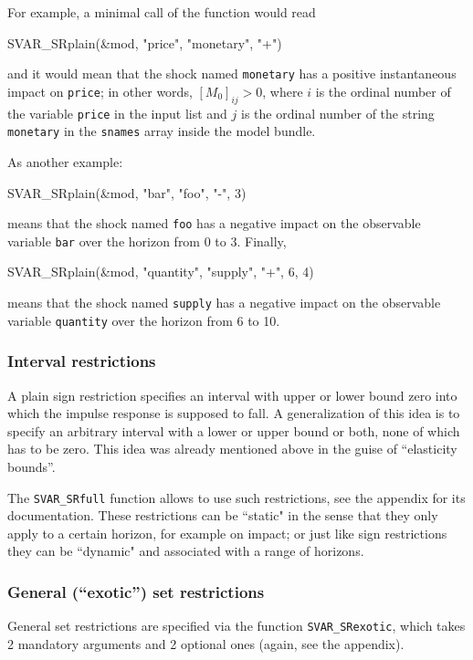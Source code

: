\documentclass[a4paper,10pt]{article}
\begin{document}
For example, a minimal call of the function would read
\begin{code}
  SVAR_SRplain(&mod, "price", "monetary", "+")
\end{code}
and it would mean that the shock named \texttt{monetary} has a
positive instantaneous impact on \texttt{price}; in other words,
$[M_0]_{ij} > 0$, where $i$ is the ordinal number of the variable
\texttt{price} in the input list and $j$ is the ordinal number of the
string \texttt{monetary} in the \texttt{snames} array inside the model
bundle.

As another example:
\begin{code}
SVAR_SRplain(&mod, "bar", "foo", "-", 3)
\end{code}
means that the shock named \texttt{foo} has a negative impact on the
observable variable \texttt{bar} over the horizon from 0 to
3. Finally,
\begin{code}
SVAR_SRplain(&mod, "quantity", "supply", "+", 6, 4)
\end{code}
means that the shock named \texttt{supply} has a negative impact on the
observable variable \texttt{quantity} over the horizon from 6 to 10.

\subsubsection{Interval restrictions}

A plain sign restriction specifies an interval with upper or lower bound zero 
into which the impulse response is supposed to fall. A generalization of this idea is to 
specify an arbitrary interval with a lower or upper bound or both, none of which has 
to be zero. This idea was already mentioned above in the guise of ``elasticity bounds''.

The \texttt{SVAR\_SRfull} function allows to use such restrictions, see the appendix 
for its documentation. These restrictions can be ``static" in the sense that they only 
apply to a certain horizon, for example on impact; or just like sign restrictions they 
can be ``dynamic" and associated with a range of horizons. 


\subsubsection{General (``exotic'') set restrictions}

General set restrictions are specified via the function
\texttt{SVAR\_SRexotic}, which takes 2 mandatory arguments and 2 optional ones
(again, see the appendix).
\end{document}

